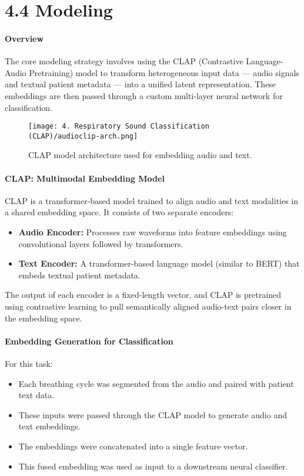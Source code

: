 \break
\section*{4.4 Modeling}

\paragraph{Overview}
The core modeling strategy involves using the CLAP (Contrastive Language-Audio Pretraining) model to transform heterogeneous input data — audio signals and textual patient metadata — into a unified latent representation. These embeddings are then passed through a custom multi-layer neural network for classification.

\begin{figure}[H]
    \centering
    \texttt{[image: 4. Respiratory Sound Classification (CLAP)/audioclip-arch.png]}
    \caption{CLAP model architecture used for embedding audio and text.}
    \label{fig:clap-model}
\end{figure}

\paragraph{CLAP: Multimodal Embedding Model}
CLAP is a transformer-based model trained to align audio and text modalities in a shared embedding space. It consists of two separate encoders:
\begin{itemize}
    \item \textbf{Audio Encoder:} Processes raw waveforms into feature embeddings using convolutional layers followed by transformers.
    \item \textbf{Text Encoder:} A transformer-based language model (similar to BERT) that embeds textual patient metadata.
\end{itemize}

The output of each encoder is a fixed-length vector, and CLAP is pretrained using contrastive learning to pull semantically aligned audio-text pairs closer in the embedding space.

\paragraph{Embedding Generation for Classification}
For this task:
\begin{itemize}
    \item Each breathing cycle was segmented from the audio and paired with patient text data.
    \item These inputs were passed through the CLAP model to generate audio and text embeddings.
    \item The embeddings were concatenated into a single feature vector.
    \item This fused embedding was used as input to a downstream neural classifier.
\end{itemize}

